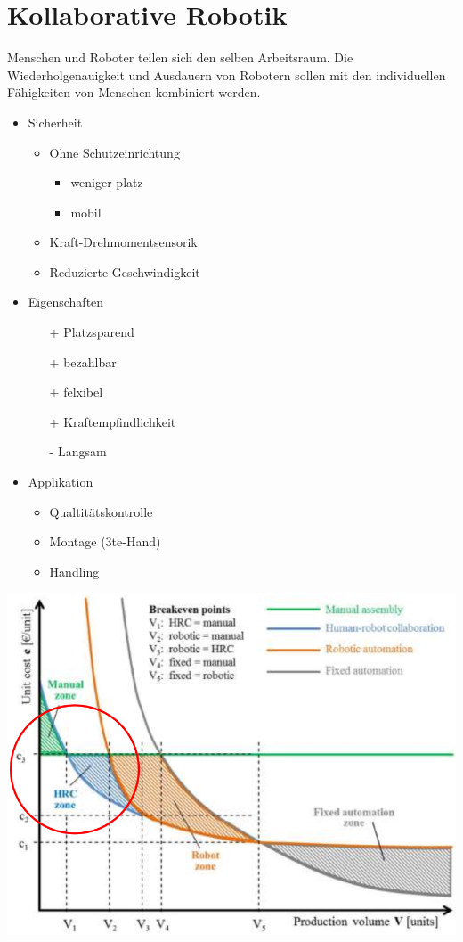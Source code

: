 \section{Kollaborative Robotik}
Menschen und Roboter teilen sich den selben Arbeitsraum.
Die Wiederholgenauigkeit und Ausdauern von Robotern sollen mit den individuellen Fähigkeiten von Menschen kombiniert werden.\newline
\begin{minipage}{0.49\linewidth}
\begin{itemize}
    \item Sicherheit
    \begin{itemize}
        \item Ohne Schutzeinrichtung
        \begin{itemize}
            \item weniger platz
            \item mobil
        \end{itemize}
        \item Kraft-Drehmomentsensorik
        \item Reduzierte Geschwindigkeit   
    \end{itemize}
    \item Eigenschaften
    \begin{itemize}
        \item[+] Platzsparend
        \item[+] bezahlbar
        \item[+] felxibel
        \item[+] Kraftempfindlichkeit
        \item[-] Langsam
    \end{itemize}
    \item Applikation
    \begin{itemize}
        \item Qualtitätskontrolle
        \item Montage (3te-Hand)
        \item Handling
    \end{itemize}
\end{itemize}
\end{minipage}
\begin{minipage}{0.5\linewidth}
    \includegraphics[width=\linewidth]{./bilder/wirtschaft}
\end{minipage}
